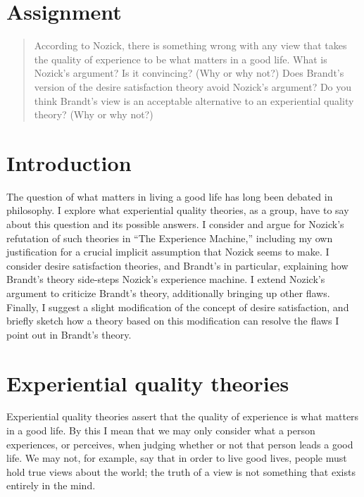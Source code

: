\documentclass[letterpaper,11pt,twoside]{article}
\title{\papertitle}
\author{Jason Gross}
\begin{document}
\section*{Assignment}
  \begin{quotation}
    \noindent According to Nozick, there is something wrong with any view that takes the quality of experience to be what matters in a good life. What is Nozick's argument? Is it convincing? (Why or why not?) Does Brandt's version of the desire satisfaction theory avoid Nozick's argument? Do you think Brandt's view is an acceptable alternative to an experiential quality theory? (Why or why not?)
  \end{quotation}

\section*{Introduction}
  The question of what matters in living a good life has long been debated in philosophy.  I explore what experiential quality theories, as a group, have to say about this question and its possible answers.  I consider and argue for Nozick's refutation of such theories in ``The Experience Machine,'' including my own justification for a crucial implicit assumption that Nozick seems to make.  I consider desire satisfaction theories, and Brandt's in particular, explaining how Brandt's theory side-steps Nozick's experience machine.  I extend Nozick's argument to criticize Brandt's theory, additionally bringing up other flaws.  Finally, I suggest a slight modification of the concept of desire satisfaction, and briefly sketch how a theory based on this modification can resolve the flaws I point out in Brandt's theory.
  
\section*{Experiential quality theories}
  Experiential quality theories assert that the quality of experience is what matters in a good life.  By this I mean that we may only consider what a person experiences, or perceives, when judging whether or not that person leads a good life.  We may not, for example, say that in order to live good lives, people must hold true views about the world; the truth of a view is not something that exists entirely in the mind.
\end{document}
